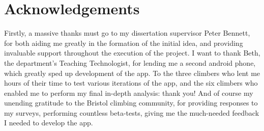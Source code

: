 \chapter*{Acknowledgements}
Firstly, a massive thanks must go to my dissertation supervisor Peter Bennett, for both aiding me greatly in the formation of the initial idea, and providing invaluable support throughout the execution of the project.
I want to thank Beth, the department's Teaching Technologist, for lending me a second android phone, which greatly sped up development of the app.
To the three climbers who lent me hours of their time to test various iterations of the app, and the six climbers who enabled me to perform my final in-depth analysis: thank you!
And of course my unending gratitude to the Bristol climbing community, for providing responses to my surveys, performing countless beta-tests, giving me the much-needed feedback I needed to develop the app.



